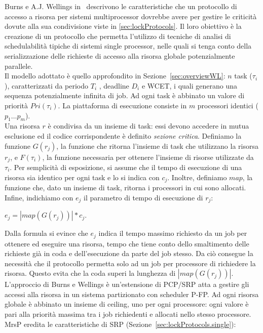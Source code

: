 Burns e A.J. Wellings in~\cite{Burns:2013:SCM:2547348.2547350} descrivono le caratteristiche che un protocollo di accesso a risorsa per sistemi multiprocessor dovrebbe avere per gestire le criticità dovute alla sua condivisione viste in \ref{sec:lockProtocols}. Il loro obiettivo è la creazione di un protocollo che permetta l’utilizzo di tecniche di analisi di schedulabilità tipiche di sistemi single processor, nelle quali si tenga conto della serializzazione delle richieste di accesso alla risorsa globale potenzialmente parallele.\\

Il modello adottato è quello approfondito in Sezione~\ref{sec:overviewWL}: $n$ task ($\tau_i$), caratterizzati da periodo $T_i$ , deadline $D_i$ e WCET, i quali generano una sequenza potenzialmente infinita di job. Ad ogni task è abbinato un valore di priorità $Pri(\tau_i)$. La piattaforma di esecuzione consiste in $m$ processori identici ($p_1 … p_m$).\\
Una risorsa $r$ è condivisa da un insieme di task: essi devono accedere in mutua esclusione ed il codice corrispondente è definito \textit{sezione critica}. Definiamo la funzione $G(r_j)$, la funzione che ritorna l’insieme di task che utilizzano la risorsa $r_j$, e $F(\tau_i)$, la funzione necessaria per ottenere l’insieme di risorse utilizzate da $\tau_i$. Per semplicità di esposizione, si assume che il tempo di esecuzione di una risorsa sia identico per ogni task e lo si indica con $c_j$. Inoltre, definiamo $map$, la funzione che, dato un insieme di task, ritorna i processori in cui sono allocati.\\
Infine, indichiamo con $e_j$ il parametro di tempo di esecuzione di $r_j$:\\

\centerline{$e_j = | map(G(r_j)) | * c_j$.}

\vspace{4 mm}

Dalla formula si evince che $e_j$ indica il tempo massimo richiesto da un job per ottenere ed eseguire una risorsa, tempo che tiene conto dello smaltimento delle richieste già in coda e dell’esecuzione da parte del job stesso. Da ciò consegue la necessità che il protocollo permetta solo ad un job per processore di richiedere la risorsa. Questo evita che la coda superi la lunghezza di $| map(G(r_j)) |$.\\

L’approccio di Burns e Wellings è un’estensione di PCP/SRP atta a gestire gli accessi alla risorsa in un sistema partizionato con scheduler P-FP. Ad ogni risorsa globale è abbinato un insieme di ceiling, uno per ogni processore: ogni valore è pari alla priorità massima tra i job richiedenti e allocati nello stesso processore.\\
MrsP eredita le caratteristiche di SRP (Sezione~\ref{sec:lockProtocols.single}):

